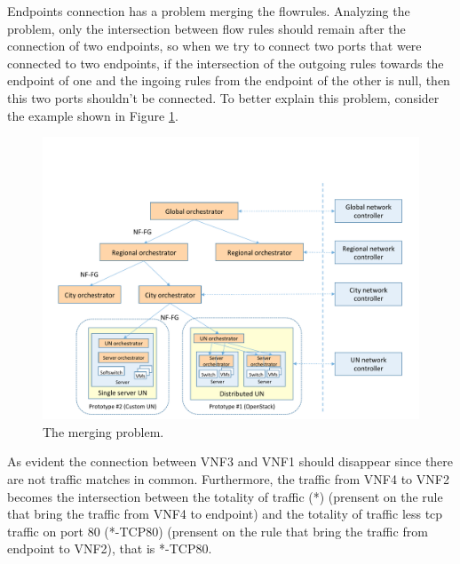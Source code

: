 Endpoints connection has a problem merging the flowrules. Analyzing the problem, only the intersection between flow rules should remain after the connection of two endpoints, so when we try to connect two ports that were connected to two endpoints, if the intersection of the outgoing rules towards the endpoint of one and the ingoing rules from the endpoint of the other is null, then this two ports shouldn't be connected. To better explain this problem, consider the example shown in Figure \ref{fig:NF-FG_the_merging_problem}.
\begin{figure}[h]
	\centering
	\includegraphics[clip= true, width= \columnwidth, trim= 0cm 2cm 0cm 0cm, page= 37]{images/Pictures_definitivo.pdf}
	\caption{The merging problem.}
	\label{fig:NF-FG_the_merging_problem}
\end{figure}
As evident the connection between VNF3 and VNF1 should disappear since there are not traffic matches in common. Furthermore, the traffic from VNF4 to VNF2 becomes the intersection between the totality of traffic (*) (prensent on the rule that bring the traffic from VNF4 to endpoint)  and the totality of traffic less tcp traffic on port 80 (*-TCP80) (prensent on the rule that bring the traffic from endpoint to VNF2), that is *-TCP80. 


